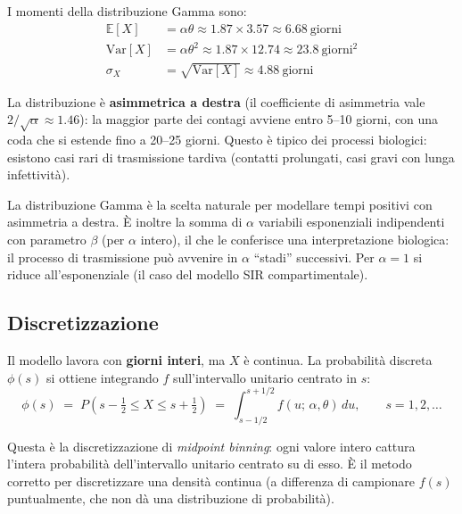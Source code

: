 \documentclass[12pt,a4paper]{article}
\begin{document}
I momenti della distribuzione Gamma sono:
\begin{align}
  \mathbb{E}[X] &= \alpha \theta \approx 1.87 \times 3.57 \approx 6.68\ \text{giorni} \\
  \mathrm{Var}[X] &= \alpha \theta^2 \approx 1.87 \times 12.74 \approx 23.8\ \text{giorni}^2 \\
  \sigma_X &= \sqrt{\mathrm{Var}[X]} \approx 4.88\ \text{giorni}
\end{align}

La distribuzione è \textbf{asimmetrica a destra} (il coefficiente di asimmetria vale
$2/\sqrt{\alpha} \approx 1.46$): la maggior parte dei contagi avviene entro 5--10 giorni, con una coda
che si estende fino a 20--25 giorni. Questo è tipico dei processi biologici: esistono
casi rari di trasmissione tardiva (contatti prolungati, casi gravi con lunga infettività).

\begin{osservazione}[title=Perché la Gamma?]
La distribuzione Gamma è la scelta naturale per modellare tempi positivi con asimmetria
a destra. È inoltre la somma di $\alpha$ variabili esponenziali indipendenti con parametro
$\beta$ (per $\alpha$ intero), il che le conferisce una interpretazione biologica:
il processo di trasmissione può avvenire in $\alpha$ ``stadi'' successivi.
Per $\alpha = 1$ si riduce all'esponenziale (il caso del modello SIR compartimentale).
\end{osservazione}

\subsection{Discretizzazione}

Il modello lavora con \textbf{giorni interi}, ma $X$ è continua. La probabilità discreta
$\phi(s)$ si ottiene integrando $f$ sull'intervallo unitario centrato in $s$:
\begin{equation}
  \phi(s) \;=\; P\!\left(s - \tfrac{1}{2} \le X \le s + \tfrac{1}{2}\right)
          \;=\; \int_{s-1/2}^{s+1/2} f(u;\,\alpha,\theta)\, du, \qquad s = 1, 2, \ldots
  \label{eq:phi_discreta}
\end{equation}

Questa è la discretizzazione di \emph{midpoint binning}: ogni valore intero cattura
l'intera probabilità dell'intervallo unitario centrato su di esso. È il metodo corretto
per discretizzare una densità continua (a differenza di campionare $f(s)$ puntualmente,
che non dà una distribuzione di probabilità).
\end{document}
